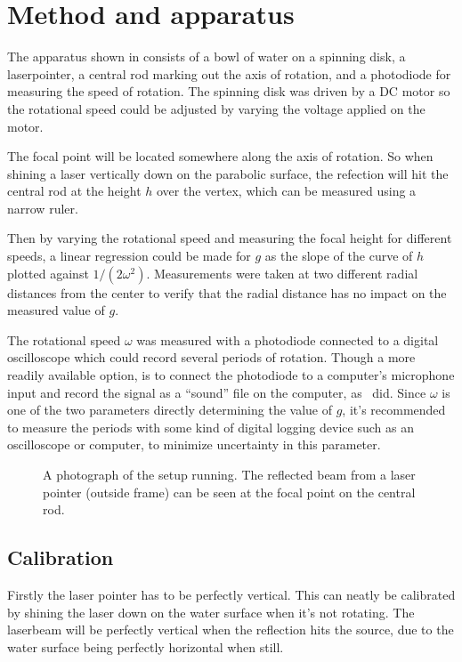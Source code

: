 \documentclass[11pt,
a4paper, 
swedish, english]{article}
\begin{document}
\section{Method and apparatus}
The apparatus shown in  consists of a bowl of water
on a spinning disk, a laserpointer, a central rod marking out the axis of
rotation, and a photodiode for measuring the speed of rotation. The spinning
disk was driven by a DC motor so the rotational speed could be
adjusted by varying the voltage applied on the motor. 

The focal point will be located somewhere along the axis of rotation. So when
shining a laser vertically down on the parabolic surface, the refection will hit
the central rod at the height $h$ over the vertex, which can be measured
using a narrow ruler. 

Then by varying the rotational speed and measuring the focal height for
different speeds, a linear regression could be made for $g$ as the
slope of the curve of $h$ plotted against $1/(2\omega^2)$. 
Measurements were taken at two different radial distances from the
center to verify that the radial distance has no impact on the measured
value of $g$. 

The rotational speed $\omega$ was measured with a photodiode connected
to a digital oscilloscope which could record several periods of
rotation. Though a more readily available option, is to connect the
photodiode to a computer's microphone input and record the signal as a
``sound'' file on the computer, as~\cite{Sabatka2010} did. Since
$\omega$ is one of the two parameters directly determining the value
of $g$, it's recommended to measure the periods with some kind of
digital logging device such as an oscilloscope or computer, to
minimize uncertainty in this parameter.

\begin{figure}
\centering
\resizebox{6cm}{!}{}
\caption{A photograph of the setup running. The
  reflected beam from a laser pointer (outside frame) can be seen at
  the focal point on the central rod. } 
\label{fig:rot_bowl_pic} 
\end{figure}

\subsection{Calibration}
Firstly the laser pointer has to be perfectly vertical. This can neatly be
calibrated by shining the laser down on the water surface when it's not
rotating. The laserbeam will be perfectly vertical when the
reflection hits the source, due to the water surface being perfectly
horizontal when still.
\end{document}
